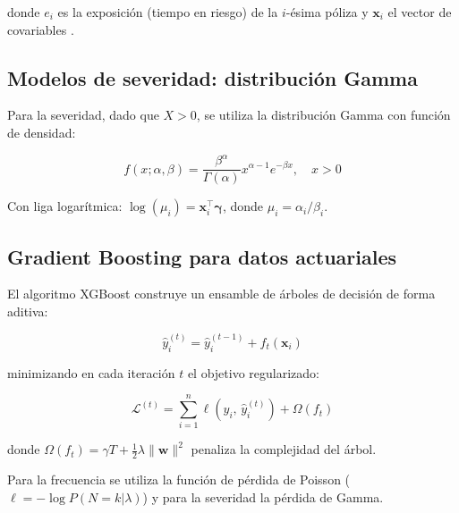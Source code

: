donde $e_i$ es la exposición (tiempo en riesgo) de la $i$-ésima póliza y $\boldsymbol{x}_i$ el vector de covariables \citep{McCullagh1989}.

\subsection{Modelos de severidad: distribución Gamma}

Para la severidad, dado que $X > 0$, se utiliza la distribución Gamma con función de densidad:

\begin{equation}
  f(x; \alpha, \beta) = \frac{\beta^\alpha}{\Gamma(\alpha)} x^{\alpha-1} e^{-\beta x}, \quad x > 0
\end{equation}

Con liga logarítmica: $\log(\mu_i) = \boldsymbol{x}_i^\top \boldsymbol{\gamma}$, donde $\mu_i = \alpha_i / \beta_i$.

\subsection{Gradient Boosting para datos actuariales}

El algoritmo XGBoost \citep{Chen2016} construye un ensamble de árboles de decisión de forma aditiva:

\begin{equation}
  \hat{y}_i^{(t)} = \hat{y}_i^{(t-1)} + f_t(\boldsymbol{x}_i)
\end{equation}

minimizando en cada iteración $t$ el objetivo regularizado:

\begin{equation}
  \mathcal{L}^{(t)} = \sum_{i=1}^{n} \ell\!\left(y_i,\, \hat{y}_i^{(t)}\right) + \Omega(f_t)
\end{equation}

donde $\Omega(f_t) = \gamma T + \frac{1}{2}\lambda \|\boldsymbol{w}\|^2$ penaliza la complejidad del árbol.

Para la frecuencia se utiliza la función de pérdida de Poisson ($\ell = -\log P(N=k|\lambda)$) y para la severidad la pérdida de Gamma.
